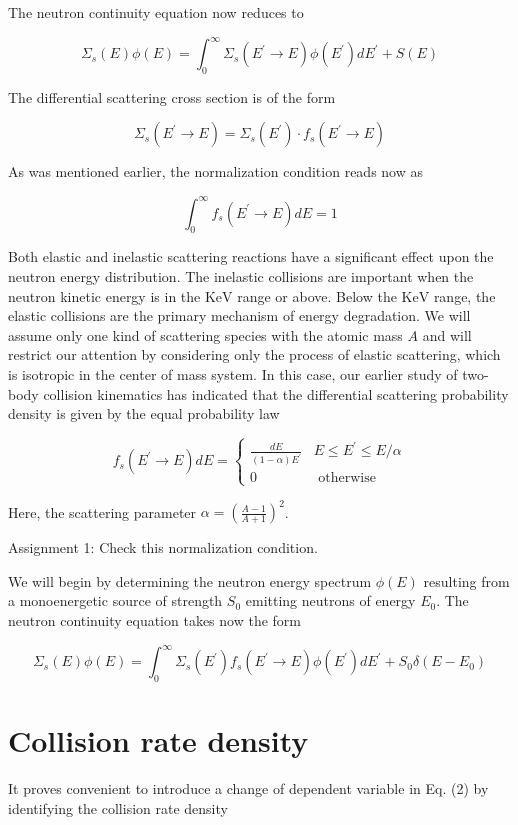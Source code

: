 \documentclass[10pt]{article}
\begin{document}
The neutron continuity equation now reduces to

$$
\Sigma_{s}(E) \phi(E)=\int_{0}^{\infty} \Sigma_{s}\left(E^{\prime} \rightarrow E\right) \phi\left(E^{\prime}\right) d E^{\prime}+S(E)
$$

The differential scattering cross section is of the form

$$
\Sigma_{s}\left(E^{\prime} \rightarrow E\right)=\Sigma_{s}\left(E^{\prime}\right) \cdot f_{s}\left(E^{\prime} \rightarrow E\right)
$$

As was mentioned earlier, the normalization condition reads now as

$$
\int_{0}^{\infty} f_{s}\left(E^{\prime} \rightarrow E\right) d E=1
$$

Both elastic and inelastic scattering reactions have a significant effect upon the neutron energy distribution. The inelastic collisions are important when the neutron kinetic energy is in the $\mathrm{KeV}$ range or above. Below the $\mathrm{KeV}$ range, the elastic collisions are the primary mechanism of energy degradation. We will assume only one kind of scattering species with the atomic mass $A$ and will restrict our attention by considering only the process of elastic scattering, which is isotropic in the center of mass system. In this case, our earlier study of two-body collision kinematics has indicated that the differential scattering probability density is given by the equal probability law

$$
f_{s}\left(E^{\prime} \rightarrow E\right) d E= \begin{cases}\frac{d E}{(1-\alpha) E^{\prime}} & E \leq E^{\prime} \leq E / \alpha \\ 0 & \text { otherwise }\end{cases}
$$

Here, the scattering parameter $\alpha=\left(\frac{A-1}{A+1}\right)^{2}$.

Assignment 1: Check this normalization condition.

We will begin by determining the neutron energy spectrum $\phi(E)$ resulting from a monoenergetic source of strength $S_{0}$ emitting neutrons of energy $E_{0}$. The neutron continuity equation takes now the form

$$
\Sigma_{s}(E) \phi(E)=\int_{0}^{\infty} \Sigma_{s}\left(E^{\prime}\right) f_{s}\left(E^{\prime} \rightarrow E\right) \phi\left(E^{\prime}\right) d E^{\prime}+S_{0} \delta\left(E-E_{0}\right)
$$

\section{Collision rate density}
It proves convenient to introduce a change of dependent variable in Eq. (2) by identifying the collision rate density
\end{document}
